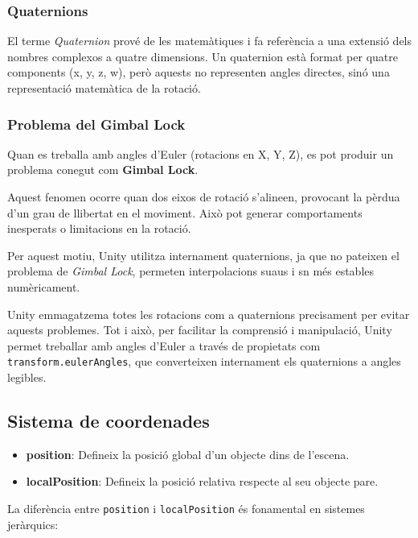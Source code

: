 \documentclass[12pt,a4paper]{report}
\begin{document}
\subsubsection{Quaternions}

El terme \textit{Quaternion} prové de les matemàtiques i fa referència a una extensió dels nombres complexos a quatre dimensions. Un quaternion està format per quatre components (x, y, z, w), però aquests no representen angles directes, sinó una representació matemàtica de la rotació. \cite{UnityQuaternion}

\subsubsection{Problema del Gimbal Lock}

Quan es treballa amb angles d'Euler (rotacions en X, Y, Z), es pot produir un problema conegut com \textbf{Gimbal Lock}.

Aquest fenomen ocorre quan dos eixos de rotació s'alineen, provocant la pèrdua d'un grau de llibertat en el moviment. Això pot generar comportaments inesperats o limitacions en la rotació. 

Per aquest motiu, Unity utilitza internament quaternions, ja que no pateixen el problema de \textit{Gimbal Lock}, permeten interpolacions suaus i sn més estables numèricament.

Unity emmagatzema totes les rotacions com a quaternions precisament per evitar aquests problemes. Tot i això, per facilitar la comprensió i manipulació, Unity permet treballar amb angles d'Euler \cite{UnityQuaternionEuler2019} a través de propietats com \texttt{transform.eulerAngles}, que converteixen internament els quaternions a angles legibles. 

\subsection{Sistema de coordenades}

\begin{itemize}
    \item \textbf{position}: Defineix la posició global d'un objecte dins de l'escena.
    \item \textbf{localPosition}: Defineix la posició relativa respecte al seu objecte pare. 
\end{itemize}

La diferència entre \texttt{position} i \texttt{localPosition} \cite{UnityTransformLocalPosition}és fonamental en sistemes jeràrquics:
\end{document}
